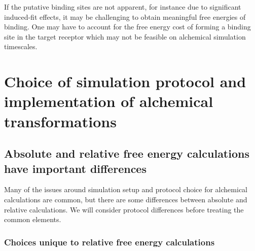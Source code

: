 \documentclass[9pt,bestpractices]{livecoms}
\begin{document}
If the putative binding sites are not apparent, for instance due to significant induced-fit effects, it may be challenging to obtain meaningful free energies of binding. One may have to account for the free energy cost of forming a binding site in the target receptor which may not be feasible on alchemical simulation timescales.

\section{Choice of simulation protocol and implementation of alchemical transformations}
\label{sec:simulation_protocol_choice}

\subsection{Absolute and relative free energy calculations have important differences}
Many of the issues around simulation setup and protocol choice for alchemical calculations are common, but there are some differences between absolute and relative calculations. We will consider protocol differences before treating the common elements.

\subsubsection{Choices unique to relative free energy calculations}
\label{sec:relative-fe-protocol}
\end{document}

